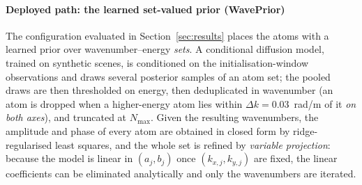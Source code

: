 \documentclass[review]{elsarticle}
\begin{document}
\paragraph{Deployed path: the learned set-valued prior (WavePrior)}
The configuration evaluated in Section~\ref{sec:results} places the atoms with a
learned prior over wavenumber--energy \emph{sets}. A conditional diffusion model,
trained on synthetic scenes, is conditioned on the initialisation-window
observations and draws several posterior samples of an atom set; the pooled draws
are then thresholded on energy, then deduplicated in wavenumber (an atom is dropped when a
higher-energy atom lies within $\Delta k = 0.03$~rad/m of it \emph{on both axes}),
and truncated at $N_{\max}$. Given the resulting
wavenumbers, the amplitude and phase of every atom are obtained in closed form by
ridge-regularised least squares, and the whole set is refined by \emph{variable
projection}: because the model is linear in $(a_j, b_j)$ once $(k_{x,j}, k_{y,j})$
are fixed, the linear coefficients can be eliminated analytically and only the
wavenumbers are iterated.
\end{document}
